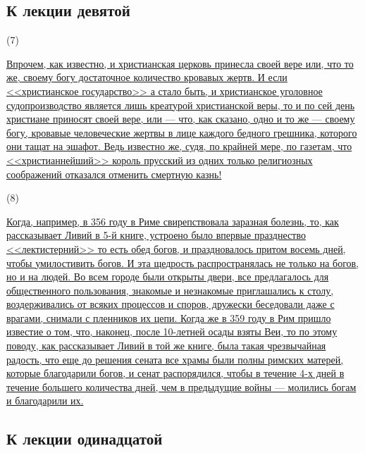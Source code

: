 \documentclass[12pt]{article}
\begin{document}
{}
\subsection*{К лекции девятой}

\hypertarget{7}{(7)} \hyperlink{b7}{Впрочем, как известно, и христианская церковь принесла своей вере или, что то же, своему богу достаточное количество кровавых жертв. И если <<христианское государство>>  а стало быть, и христианское уголовное судопроизводство является лишь креатурой христианской веры, то и по сей день христиане приносят своей вере, или --- что, как сказано, одно и то же --- своему богу, кровавые человеческие жертвы в лице каждого бедного грешника, которого они тащат на эшафот. Ведь известно же, судя, по крайней мере, по газетам, что <<христианнейший>> король прусский из одних только религиозных соображений отказался отменить смертную казнь!}

\hypertarget{8}{(8)} \hyperlink{b8}{Когда, например, в 356 году в Риме свирепствовала заразная болезнь, то, как рассказывает Ливий в 5-й книге, устроено было впервые празднество <<лектистерний>>  то есть обед богов, и праздновалось притом восемь дней, чтобы умилостивить богов. И эта щедрость распространялась не только на богов, но и на людей. Во всем городе были открыты двери, все предлагалось для общественного пользования, знакомые и незнакомые приглашались к столу, воздерживались от всяких процессов и споров, дружески беседовали даже с врагами, снимали с пленников их цепи. Когда же в 359 году в Рим пришло известие о том, что, наконец, после 10-летней осады взяты Веи, то по этому поводу, как рассказывает Ливий в той же книге, была такая чрезвычайная радость, что еще до решения сената все храмы были полны римских матерей, которые благодарили богов, и сенат распорядился, чтобы в течение 4-х дней в течение большего количества дней, чем в предыдущие войны --- молились богам и благодарили их.}

{}
\subsection*{К лекции одинадцатой} 
\end{document}
